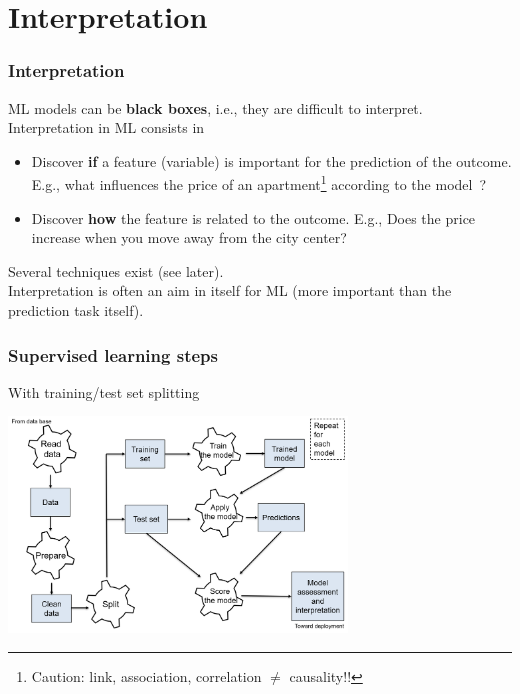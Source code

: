 \section{Interpretation}
\begin{frame}
\frametitle{Interpretation}
ML models can be {\bf black boxes}, i.e., they are difficult to interpret. Interpretation in ML consists in 
\begin{itemize}
\item Discover {\bf if} a feature (variable) is important for the prediction of the outcome. E.g., what influences the price of an apartment\footnote{Caution: link, association, correlation $\neq$ causality!!} according to the model~?
\item Discover {\bf how} the feature is related to the outcome. E.g., Does the price increase when you move away from the city center?
\end{itemize}
Several techniques exist (see later).\\
\vspace{0.3cm} 
Interpretation is often an aim in itself for ML (more important than the prediction task itself). 
\end{frame}
\begin{frame}
\frametitle{Supervised learning steps}
\small
With training/test set splitting\\
\normalsize
\begin{center}
\includegraphics[width=9cm]{../Graphs/ML_steps.png}
\end{center}
\end{frame}
